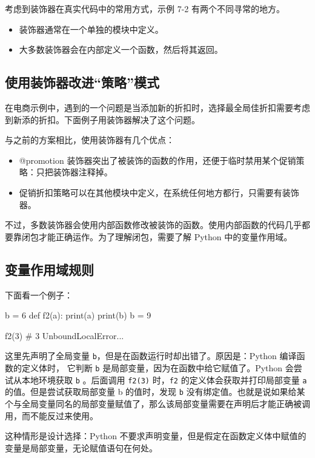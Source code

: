考虑到装饰器在真实代码中的常用方式，示例 7-2 有两个不同寻常的地方。
\begin{itemize}
    \item 装饰器通常在一个单独的模块中定义。
    \item 大多数装饰器会在内部定义一个函数，然后将其返回。
\end{itemize}

\subsection{使用装饰器改进``策略''模式}

在电商示例中，遇到的一个问题是当添加新的折扣时，选择最全局佳折扣需要考虑到新添的折扣。下面例子用装饰器解决了这个问题。



与之前的方案相比，使用装饰器有几个优点：
\begin{itemize}
    \item @promotion 装饰器突出了被装饰的函数的作用，还便于临时禁用某个促销策略：只把装饰器注释掉。
    \item 促销折扣策略可以在其他模块中定义，在系统任何地方都行，只需要有装饰器。
\end{itemize}

不过，多数装饰器会使用内部函数修改被装饰的函数。使用内部函数的代码几乎都要靠闭包才能正确运作。为了理解闭包，需要了解 Python 中的变量作用域。

\subsection{变量作用域规则}

下面看一个例子：
\begin{python}
    b = 6
    def f2(a):
    print(a)
    print(b)
    b = 9
    
    f2(3)   # 3 UnboundLocalError...
\end{python}

这里先声明了全局变量 \texttt{b}，但是在函数运行时却出错了。原因是：Python 编译函数的定义体时， 它判断 \texttt{b} 是局部变量，因为在函数中给它赋值了。Python 会尝试从本地环境获取 \texttt{b} 。后面调用 \texttt{f2(3)} 时，\texttt{f2} 的定义体会获取并打印局部变量 \texttt{a} 的值。但是尝试获取局部变量 b 的值时，发现 \texttt{b} 没有绑定值。也就是说如果给某个与全局变量同名的局部变量赋值了，那么该局部变量需要在声明后才能正确被调用，而不能反过来使用。

这种情形是设计选择：Python 不要求声明变量，但是假定在函数定义体中赋值的变量是局部变量，无论赋值语句在何处。

